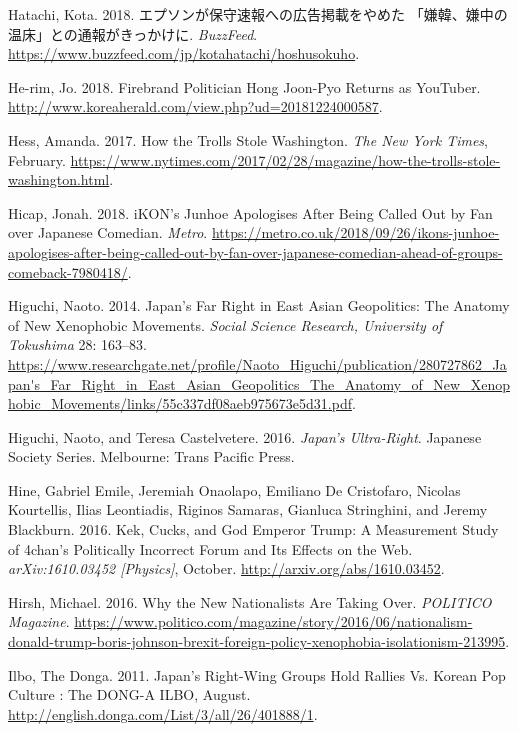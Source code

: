\documentclass[10pt,british,A4paper,,openany]{memoir}
\begin{document}
\hypertarget{ref-hatachi__2018}{}
Hatachi, Kota. 2018. エプソンが保守速報への広告掲載をやめた
「嫌韓、嫌中の温床」との通報がきっかけに. \emph{BuzzFeed}.
\url{https://www.buzzfeed.com/jp/kotahatachi/hoshusokuho}.

\hypertarget{ref-he-rim_firebrand_2018}{}
He-rim, Jo. 2018. Firebrand Politician Hong Joon-Pyo Returns as
YouTuber. \url{http://www.koreaherald.com/view.php?ud=20181224000587}.

\hypertarget{ref-hess_how_2017}{}
Hess, Amanda. 2017. How the Trolls Stole Washington. \emph{The New York
Times}, February.
\url{https://www.nytimes.com/2017/02/28/magazine/how-the-trolls-stole-washington.html}.

\hypertarget{ref-hicap_ikons_2018}{}
Hicap, Jonah. 2018. iKON's Junhoe Apologises After Being Called Out by
Fan over Japanese Comedian. \emph{Metro}.
\url{https://metro.co.uk/2018/09/26/ikons-junhoe-apologises-after-being-called-out-by-fan-over-japanese-comedian-ahead-of-groups-comeback-7980418/}.

\hypertarget{ref-higuchi_japans_2014}{}
Higuchi, Naoto. 2014. Japan's Far Right in East Asian Geopolitics: The
Anatomy of New Xenophobic Movements. \emph{Social Science Research,
University of Tokushima} 28: 163--83.
\url{https://www.researchgate.net/profile/Naoto_Higuchi/publication/280727862_Japan's_Far_Right_in_East_Asian_Geopolitics_The_Anatomy_of_New_Xenophobic_Movements/links/55c337df08aeb975673e5d31.pdf}.

\hypertarget{ref-higuchi_japans_2016}{}
Higuchi, Naoto, and Teresa Castelvetere. 2016. \emph{Japan's
Ultra-Right}. Japanese Society Series. Melbourne: Trans Pacific Press.

\hypertarget{ref-hine_kek_2016}{}
Hine, Gabriel Emile, Jeremiah Onaolapo, Emiliano De Cristofaro, Nicolas
Kourtellis, Ilias Leontiadis, Riginos Samaras, Gianluca Stringhini, and
Jeremy Blackburn. 2016. Kek, Cucks, and God Emperor Trump: A Measurement
Study of 4chan's Politically Incorrect Forum and Its Effects on the Web.
\emph{arXiv:1610.03452 {[}Physics{]}}, October.
\url{http://arxiv.org/abs/1610.03452}.

\hypertarget{ref-hirsh_why_2016}{}
Hirsh, Michael. 2016. Why the New Nationalists Are Taking Over.
\emph{POLITICO Magazine}.
\url{https://www.politico.com/magazine/story/2016/06/nationalism-donald-trump-boris-johnson-brexit-foreign-policy-xenophobia-isolationism-213995}.

\hypertarget{ref-the_donga_ilbo_japans_2011}{}
Ilbo, The Donga. 2011. Japan's Right-Wing Groups Hold Rallies Vs. Korean
Pop Culture : The DONG-A ILBO, August.
\url{http://english.donga.com/List/3/all/26/401888/1}.
\end{document}
